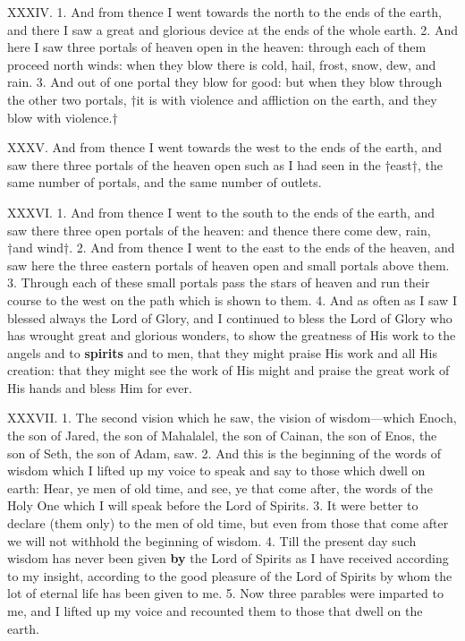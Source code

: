 
XXXIV. 1. And from thence I went towards the
north to the ends of the earth, and there I saw a great
and glorious device at the ends of the whole earth.
2. And here I saw three portals of heaven open in
the heaven: through each of them proceed north
winds: when they blow there is cold, hail, frost,
snow, dew, and rain. 3. And out of one portal they
blow for good: but when they blow through the
other two portals, †it is with violence and affliction
on the earth, and they blow with violence.†

XXXV. And from thence I went towards the west
to the ends of the earth, and saw there three portals
of the heaven open such as I had seen in the †east†,
the same number of portals, and the same number of
outlets.


XXXVI. 1. And from thence I went to the south
to the ends of the earth, and saw there three open
portals of the heaven: and thence there come dew,
rain, †and wind†. 2. And from thence I went to
the east to the ends of the heaven, and saw here the
three eastern portals of heaven open and small portals
above them. 3. Through each of these small portals
pass the stars of heaven and run their course to the
west on the path which is shown to them. 4. And as
often as I saw I blessed always the Lord of Glory, and
I continued to bless the Lord of Glory who has wrought
great and glorious wonders, to show the greatness of
His work to the angels and to \textbf{spirits} and to men,
that they might praise His work and all His creation:
that they might see the work of His might and
praise the great work of His hands and bless Him
for ever.


XXXVII. 1. The second vision which he saw, the
vision of wisdom—which Enoch, the son of Jared,
the son of Mahalalel, the son of Cainan, the son of
Enos, the son of Seth, the son of Adam, saw. 2. And
this is the beginning of the words of wisdom which
I lifted up my voice to speak and say to those which
dwell on earth: Hear, ye men of old time, and see,
ye that come after, the words of the Holy One which
I will speak before the Lord of Spirits. 3. It were
better to declare (them only) to the men of old
time, but even from those that come after we will
not withhold the beginning of wisdom. 4. Till the
present day such wisdom has never been given \textbf{by}
the Lord of Spirits as I have received according to
my insight, according to the good pleasure of the
Lord of Spirits by whom the lot of eternal life has
been given to me. 5. Now three parables were imparted
to me, and I lifted up my voice and recounted
them to those that dwell on the earth.

